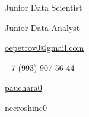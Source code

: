 \documentclass[11pt]{spidercv}
\begin{document}
    \PrintableMode

    \begin{TopBar}{\ColorTextSide}


        \begin{DoubleColumns}
            \begin{ItemList}{\ColorHighlight}
                    \item Junior Data Scientist
            \end{ItemList}
            \nextcolumn
            \begin{ItemList}{\ColorHighlight}
                    \item Junior Data Analyst
            \end{ItemList}
        \end{DoubleColumns}

        \vspace*{0.2cm}

        \begin{DoubleColumns}
            \begin{ItemList}{\ColorHighlight}
                \item [\Large\faEnvelopeO] \href{mailto:oepetrov0@gmail.com}{oepetrov0@gmail.com}
                \item [\Large\faPhone] +7 (993) 907 56-44
            \end{ItemList}
            \nextcolumn
            \begin{ItemList}{\ColorHighlight}
                \item [\Large\faPaperPlaneO] \href{https://t.me/pauchara0}{pauchara0}
                \item [\Large\faGithub] \href{https://github.com/necroshine0}{necroshine0}
            \end{ItemList}
            \nextcolumn
            \begin{ItemList}{\ColorHighlight}
            \end{ItemList}
        \end{DoubleColumns}

    \end{TopBar}
\end{document}
